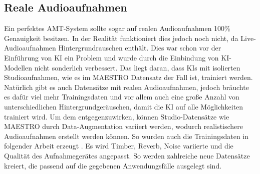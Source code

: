\subsection{Reale Audioaufnahmen}
Ein perfektes AMT-System sollte sogar auf realen Audioaufnahmen 100\% Genauigkeit besitzen.
In der Realität funktioniert dies jedoch noch nicht, da Live-Audioaufnahmen Hintergrundrauschen enthält.
Dies war schon vor der Einführung von KI ein Problem und wurde durch die Einbindung
von KI-Modellen nicht sonderlich verbessert.
Das liegt daran, dass KIs mit isolierten Studioaufnahmen, wie es im MAESTRO Datensatz der Fall ist, trainiert werden.
Natürlich gibt es auch Datensätze mit realen Audioaufnahmen, jedoch bräuchte es dafür viel mehr Trainingsdaten und
vor allem auch eine große Anzahl von unterschiedlichen Hintergrundgeräuschen,
damit die KI auf alle Möglichkeiten trainiert wird.
Um dem entgegenzuwirken, können Studio-Datensätze wie MAESTRO durch Data-Augmentation variiert werden,
wodurch realistischere Audioaufnahmen erstellt werden können.
So wurden auch die Trainingsdaten in folgender Arbeit erzeugt \cite{kusaka2024mobile}.
Es wird Timber, Reverb, Noise variierte und die Qualität des Aufnahmegerätes angepasst.
So werden zahlreiche neue Datensätze kreiert, die passend auf die gegebenen Anwendungsfälle ausgelegt sind.

